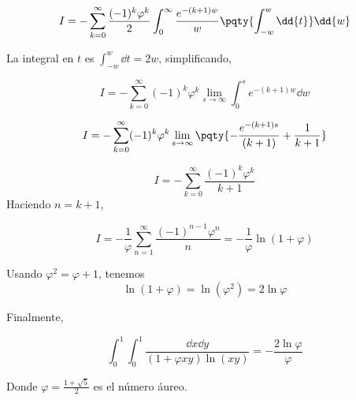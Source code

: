 {	$$  
	I = - \sum_{k=0}^\infty \frac{(-1)^k \varphi^k}{2} \int_0^\infty \frac{e^{-(k+1)w}}{ w} \pqty{\int_{-w}^w \dd{t}} \dd{w} 
	$$  
	
	La integral en $t$ es $\displaystyle \int_{-w}^w \dd{t} = 2w$, \; simplificando, 
	 
	$$
	I= -\sum_{k=0}^\infty (-1)^k \varphi^k  \lim\limits_{s \to \infty} \int_0^s e^{-(k+1)w} \dd{w}
	$$  
	
	$$  
	I  =-\sum_{k=0}^\infty (-1)^k \varphi^k \lim\limits_{s \to \infty} \pqty{- \frac{ e^{-(k+1)s}}{(k+1)} +  \frac{1}{k+1} }  
	$$
	
	$$
	I=- \sum_{k=0}^\infty \frac{(-1)^k \varphi^k}{k + 1}  
	$$  
	Haciendo $n = k + 1$,   
	
	$$  
	I = -\frac{1}{\varphi} \sum_{n=1}^\infty \frac{(-1)^{n-1} \varphi^n}{n} =- \frac{1}{\varphi} \ln(1 + \varphi)  
	$$  
	
	Usando $\varphi^2 = \varphi + 1$, tenemos  
	$$  
	\ln(1 + \varphi) = \ln(\varphi^2) = 2\ln\varphi 
	$$  
	
	 Finalmente,   
	
	
}

\begin{LnxRptaBox} 
	\begin{equation*}
		   \int_0^1 \int_0^1 \frac{ \dd{x}\dd{y}}{(1 + \varphi xy) \ln (xy)}=-\frac{2\ln\varphi}{\varphi}  
	\end{equation*} 
\end{LnxRptaBox} 
Donde  \( \varphi = \frac{1+\sqrt{5}}{2} \) es el número áureo.

